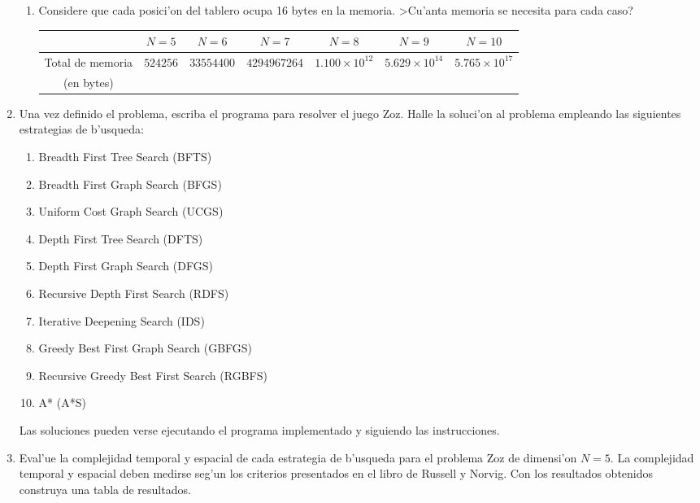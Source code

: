 \documentclass[11pt]{article}
\begin{document}
\begin{enumerate}
\begin{enumerate}
	\item Considere que cada posici'on del tablero ocupa 16 bytes en la memoria. >Cu'anta memoria se necesita para cada caso? \\
	
	\begin{tabular}{|c|c|c|c|c|c|c|}
	\hline	
	& $N=5$ & $N=6$ & $N=7$ & $N=8$ & $N=9$ & $N=10$ \\ \hline
	Total de memoria & $524256$ & $33554400$ & $4294967264$ & 			$1.100\times10^{12}$ & $5.629\times10^{14}$ & 						$5.765\times10^{17}$ \\ 
	(en bytes) & & & & & & \\ \hline
	\end{tabular}	

	\end{enumerate}

\item Una vez definido el problema, escriba el programa para resolver el juego Zoz. Halle la soluci'on al problema empleando las siguientes estrategias de b'usqueda:
	\begin{enumerate}
	\item Breadth First Tree Search (BFTS)
	\item Breadth First Graph Search (BFGS)
	\item Uniform Cost Graph Search (UCGS)
	\item Depth First Tree Search (DFTS)
	\item Depth First Graph Search (DFGS)
	\item Recursive Depth First Search (RDFS)
	\item Iterative Deepening Search (IDS)
	\item Greedy Best First Graph Search (GBFGS)
	\item Recursive Greedy Best First Search (RGBFS)
	\item A* (A*S) \\
	\end{enumerate}		

Las soluciones pueden verse ejecutando el programa implementado y siguiendo las instrucciones. \\

\item Eval'ue la complejidad temporal y espacial de cada estrategia de b'usqueda para el problema Zoz de dimensi'on $N = 5$. La complejidad temporal y espacial deben medirse seg'un los criterios presentados en el libro de Russell y Norvig. Con los resultados obtenidos construya una tabla de resultados. \\


\end{enumerate}
\end{document}
